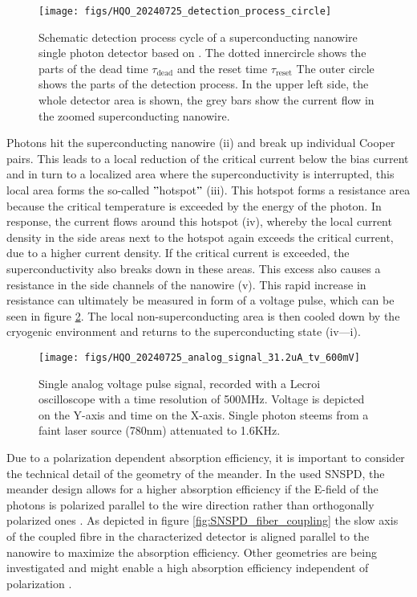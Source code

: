 \begin{figure}[hhh]
    \centering
    \texttt{[image: figs/HQO\_20240725\_detection\_process\_circle]}
    \caption{Schematic detection process cycle of a superconducting nanowire single photon detector based on \cite{singlequantum_snsd_nodate}.
    The dotted innercircle shows the parts of the dead time $\tau_{\text{dead}}$ and the reset time $\tau_{\text{reset}}$
    The outer circle shows the parts of the detection process.
    In the upper left side, the whole detector area is shown, the grey bars show the current flow in the zoomed superconducting nanowire.}
    \label{fig: SNSPD_process}
\end{figure}



Photons hit the superconducting nanowire (ii) and break up individual Cooper pairs.
This leads to a local reduction of the critical current below the bias current and in turn to a localized area where
the superconductivity is interrupted, this local area forms the so-called \("\)hotspot\("\) (iii).
This hotspot forms a resistance area because the critical temperature is exceeded by the energy of the photon.
In response, the current flows around this hotspot (iv), whereby the local current density in the side areas next to the
hotspot again exceeds the critical current, due to a higher current density.
If the critical current is exceeded, the superconductivity also breaks down in these areas.
This excess also causes a resistance in the side channels of the nanowire (v).
This rapid increase in resistance can ultimately be measured in form of a voltage pulse, which can be seen in figure \ref{fig:SNSPD_single_voltage_pulse}.
The local non-superconducting area is then cooled down by the cryogenic environment and returns to the superconducting state
(iv—i).\\

\begin{figure}[H]
    \centering
    \texttt{[image: figs/HQO\_20240725\_analog\_signal\_31.2uA\_tv\_600mV]}
    \caption{Single analog voltage pulse signal, recorded with a Lecroi oscilloscope with a time resolution of 500MHz.
    Voltage is depicted on the Y-axis and time on the X-axis. Single photon steems from a faint laser source (780nm) attenuated to 1.6KHz.}
    \label{fig:SNSPD_single_voltage_pulse}
\end{figure}


Due to a polarization dependent absorption efficiency, it is important to consider the technical detail of the geometry of the meander.
In the used SNSPD, the meander design allows for a higher absorption efficiency if the E-field of the photons
is polarized parallel to the wire direction rather than orthogonally polarized ones \cite{single-quantum-2022}.
As depicted in figure \ref{fig:SNSPD_fiber_coupling} the slow axis of the coupled fibre in the characterized
detector is aligned parallel to the nanowire to maximize the absorption efficiency.
Other geometries are being investigated and might enable a high absorption efficiency independent of polarization \cite{zheng-2016}.

